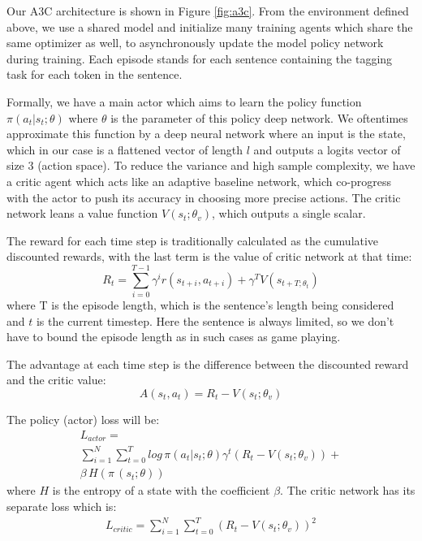 \documentclass[11pt,a4paper]{article}
\begin{document}
Our A3C architecture is shown in Figure \ref{fig:a3c}. From the environment defined above, we use a shared model and initialize many training agents which share the same optimizer as well, to asynchronously update the model policy network during training. Each episode stands for each sentence containing the tagging task for each token in the sentence. 

Formally, we have a main actor which aims to learn the policy function $\pi(a_t | s_t; \theta)$ where $\theta$ is the parameter of this policy deep network. We oftentimes approximate this function by a deep neural network where an input is the state, which in our case is a flattened vector of length $l$ and outputs a logits vector of size 3 (action space). To reduce the variance and high sample complexity, we have a critic agent which acts like an adaptive baseline network, which co-progress with the actor to push its accuracy in choosing more precise actions. The critic network leans a value function $V(s_t; \theta_v)$, which outputs a single scalar. 

The reward for each time step is traditionally calculated as the cumulative discounted rewards, with the last term is the value of critic network at that time: 
\[
    R_t = \sum_{i=0}^{T-1} \gamma^i r(s_{t+i}, a_{t+i}) + \gamma^T V(s_{t+T; \theta_t})
\]
where T is the episode length, which is the sentence's length being considered and $t$ is the current timestep. Here the sentence is always limited, so we don't have to bound the episode length as in such cases as game playing. 

The advantage at each time step is the difference between the discounted reward and the critic value: 
\[
	A(s_t, a_t) = R_t - V(s_t; \theta_v)
\]

The policy (actor) loss will be: 
\begin{equation}
\begin{aligned}
	L_{actor} = \\
    \sum_{i=1}^{N} \sum_{t=0}^{T} log \, \pi(a_t | s_t; \theta) \gamma^t (R_t - V(s_t; \theta_v)) + \\ 
    \beta \, H(\pi \, (s_t; \theta))  
\end{aligned}
\end{equation}
where $H$ is the entropy of a state with the coefficient $\beta$. The critic network has its separate loss which is: 
\begin{equation}
\begin{aligned}
	L_{critic} = \sum_{i=1}^{N} \sum_{t=0}^{T} (R_t - V(s_t; \theta_v))^2
\end{aligned}
\end{equation}
\end{document}
